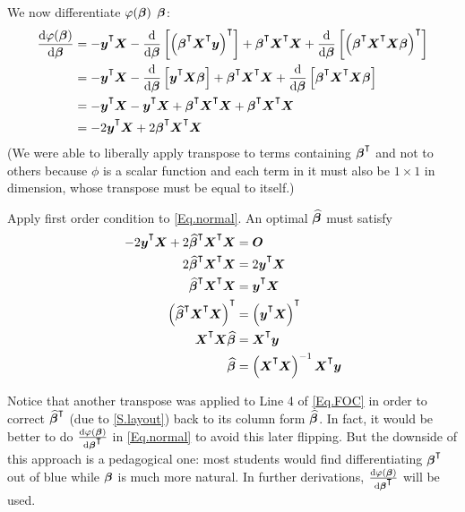 We now differentiate $\varphi(\boldsymbol{\beta})$ \wrt $\boldsymbol{\beta}$:
\begin{equation}\label{Eq.normal}
  \begin{aligned}
    \frac{\dd \phi(\m{\beta})}{\dd\m{\beta}}&=-\T{y}\m{X}-\frac{\dd}{\dd\m{\beta}}\left[\left(\T{\beta}\T{X}\m{y}\right)\Ts\right]+\T{\beta}\T{X}\m{X}+\frac{\dd}{\dd\m{\beta}}\left[\left(\T{\beta}\T{X}\m{X\beta}\right)\Ts\right]\\
    &=-\T{y}\m{X}-\frac{\dd}{\dd\m{\beta}}\left[\T{y}\m{X}\m{\beta}\right]+\T{\beta}\T{X}\m{X}+\frac{\dd}{\dd\m{\beta}}\left[\T{\beta}\T{X}\m{X}\m{\beta}\right]\\
    &=-\T{y}\m{X}-\T{y}\m{X}+\T{\beta}\T{X}\m{X}+\T{\beta}\T{X}\m{X}\\
    &=-2\T{y}\m{X}+2\T{\beta}\T{X}\m{X}
  \end{aligned}
\end{equation}
(We were able to liberally apply transpose to terms containing $\T{\beta}$ and not to others because $\phi$ is a scalar function and each term in it must also be $1\times 1$ in dimension, whose transpose must be equal to itself.)

Apply first order condition to \cref{Eq.normal}. An optimal $\widehat{\boldsymbol{\beta}}$ must satisfy
\begin{equation}\label{Eq.FOC}
  \begin{aligned}
    -2\T{y}\m{X}+2\mhat{\beta}\Ts\T{X}\m{X}&=\Z\\
    2\mhat{\beta}\Ts\T{X}\m{X}&=2\T{y}\m{X}\\
    \mhat{\beta}\Ts\T{X}\m{X}&=\T{y}\m{X}\\
    \left(\mhat{\beta}\Ts\T{X}\m{X}\right)\Ts&=\left(\T{y}\m{X}\right)\Ts\\
    \T{X}\m{X}\mhat{\beta}&=\T{X}\m{y}\\
    \mhat{\beta}&=\left( \T{X}\m{X} \right)^{-1} \T{X}\m{y}
  \end{aligned}
\end{equation}

Notice that another transpose was applied to Line 4 of \cref{Eq.FOC} in order to correct $\mhat{\beta}\Ts$ (due to \cref{S.layout}) back to its column form $\widehat{\boldsymbol{\beta}}$. In fact, it would be better to do $\frac{\dd\phi(\m{\beta})}{\dd\T{\beta}}$ in \cref{Eq.normal} to avoid this later flipping. But the downside of this approach is a pedagogical one: most students would find differentiating \wrt $\T{\beta}$ out of blue while \wrt $\boldsymbol{\beta}$ is much more natural. In further derivations, $\frac{\dd\phi(\m{\beta})}{\dd\T{\beta}}$ will be used.

